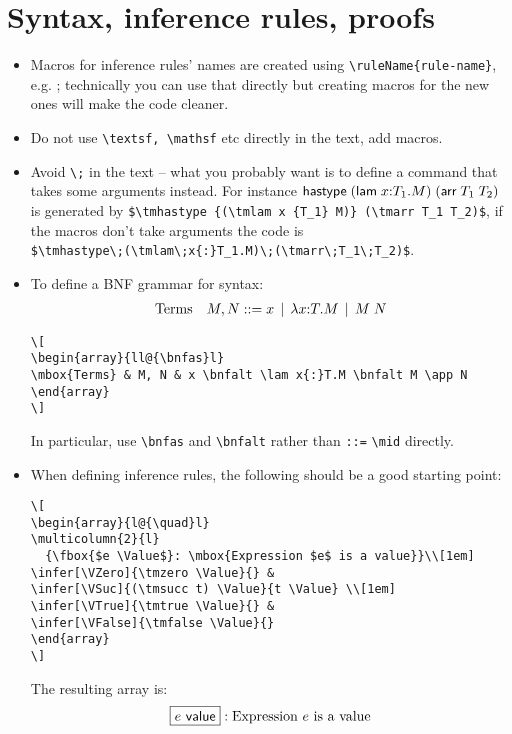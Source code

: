 \documentclass[12pt,draft]{article}
\begin{document}
\section{Syntax, inference rules, proofs}
\begin{itemize}
\item Macros for inference rules' names are created using \verb#\ruleName{rule-name}#, e.g. ; technically you can use that directly but creating macros for the new ones will make the code cleaner.
\item Do not use \verb#\textsf, \mathsf# etc directly in the text, add macros.
\item Avoid \verb#\;# in the text -- what you probably want is to define a command that takes some arguments instead. For instance $\textsf{hastype}\;(\textsf{lam}\;x{:}T_1.M)\;(\textsf{arr}\;T_1\;T_2)$ is generated by \verb#$\tmhastype {(\tmlam x {T_1} M)} (\tmarr T_1 T_2)$#, if the macros don't take arguments the code is\\
\verb#$\tmhastype\;(\tmlam\;x{:}T_1.M)\;(\tmarr\;T_1\;T_2)$#.
\item To define a BNF grammar for syntax:
\[
\begin{array}{ll@{\bnfas}l}
\mbox{Terms} & M, N & x \bnfalt \lam x{:}T.M \bnfalt M \app N
\end{array}
\]
\begin{verbatim}
\[
\begin{array}{ll@{\bnfas}l}
\mbox{Terms} & M, N & x \bnfalt \lam x{:}T.M \bnfalt M \app N
\end{array}
\]
\end{verbatim}
In particular, use \verb#\bnfas# and \verb#\bnfalt# rather than \verb#::=# \verb#\mid# directly.
\item When defining inference rules, the following should be a good starting point:
\begin{verbatim}
\[
\begin{array}{l@{\quad}l}
\multicolumn{2}{l}
  {\fbox{$e \Value$}: \mbox{Expression $e$ is a value}}\\[1em]
\infer[\VZero]{\tmzero \Value}{} &
\infer[\VSuc]{(\tmsucc t) \Value}{t \Value} \\[1em]
\infer[\VTrue]{\tmtrue \Value}{} &
\infer[\VFalse]{\tmfalse \Value}{}
\end{array}
\]
\end{verbatim}
The resulting array is:
\[
\begin{array}{l@{\quad}l}
\multicolumn{2}{l}{\fbox{$e \Value$}: \mbox{Expression $e$ is a value}}\\[1em]

\end{array}\]
\end{itemize}
\end{document}
